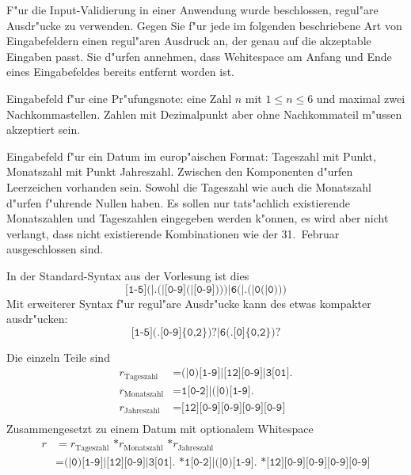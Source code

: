 F"ur die Input-Validierung in einer Anwendung wurde beschlossen, regul"are
Ausdr"ucke zu verwenden.
Gegen Sie f"ur jede im folgenden beschriebene Art von Eingabefeldern einen
regul"aren Ausdruck an, der genau auf die akzeptable Eingaben passt.
Sie d"urfen annehmen, dass Wehitespace am Anfang und Ende eines Eingabefeldes
bereits entfernt worden ist.
\begin{teilaufgaben}
\item
Eingabefeld f"ur eine Pr"ufungsnote: eine Zahl $n$ mit $1\le n\le 6$
und maximal zwei Nachkommastellen.
Zahlen mit Dezimalpunkt aber ohne Nachkommateil m"ussen akzeptiert sein.
\item
Eingabefeld f"ur ein Datum im europ"aischen Format: Tageszahl mit Punkt,
Monatszahl mit Punkt Jahreszahl. Zwischen den Komponenten d"urfen Leerzeichen
vorhanden sein.
Sowohl die Tageszahl wie auch die Monatszahl d"urfen f"uhrende Nullen haben.
Es sollen nur tats"achlich existierende Monatszahlen
und Tageszahlen eingegeben werden k"onnen, es wird aber nicht verlangt,
dass nicht existierende Kombinationen wie der 31.~Februar ausgeschlossen
sind.
\end{teilaufgaben}

\begin{loesung}
\begin{teilaufgaben}
\item In der Standard-Syntax aus der Vorlesung ist dies
\[
\texttt{[1-5](|.(|[0-9](|[0-9])))|6(|.(|0(|0)))}
\]
Mit erweiterer Syntax f"ur regul"are Ausdr"ucke kann des etwas kompakter
ausdr"ucken:
\[
\texttt{[1-5](.[0-9]\{0,2\})?|6(.[0]\{0,2\})?}
\]
\item Die einzeln Teile sind
\begin{align*}
r_{\text{Tageszahl}}
&=
\texttt{(|0)[1-9]|[12][0-9]|3[01].}
\\
r_{\text{Monatszahl}}
&=
\texttt{1[0-2]|(|0)[1-9].}
\\
r_{\text{Jahreszahl}}
&=
\texttt{[12][0-9][0-9][0-9][0-9]}
\\
\end{align*}
Zusammengesetzt zu einem Datum mit optionalem Whitespace
\begin{align*}
r
&=
r_{\text{Tageszahl}}
\texttt{ *}
r_{\text{Monatszahl}}
\texttt{ *}
r_{\text{Jahreszahl}}
\\
&=
\texttt{(|0)[1-9]|[12][0-9]|3[01].}
\texttt{ *}
\texttt{1[0-2]|(|0)[1-9].}
\texttt{ *}
\texttt{[12][0-9][0-9][0-9][0-9]}
\end{align*}
\item
\end{teilaufgaben}
\end{loesung}

\begin{bewertung}
\end{bewertung}

